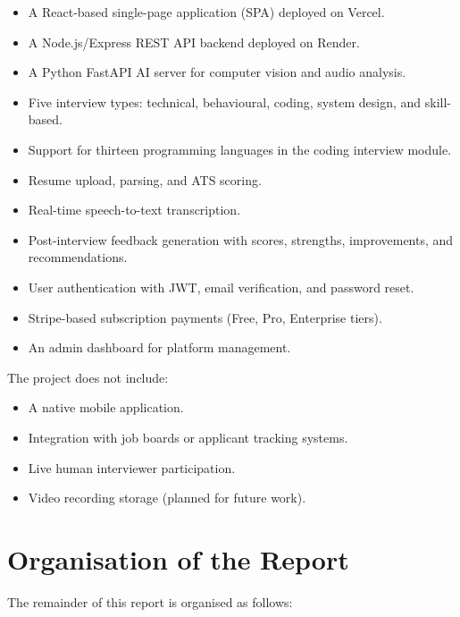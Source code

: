 \begin{itemize}
    \item A React-based single-page application (SPA) deployed on Vercel.
    \item A Node.js/Express REST API backend deployed on Render.
    \item A Python FastAPI AI server for computer vision and audio analysis.
    \item Five interview types: technical, behavioural, coding, system design, and skill-based.
    \item Support for thirteen programming languages in the coding interview module.
    \item Resume upload, parsing, and ATS scoring.
    \item Real-time speech-to-text transcription.
    \item Post-interview feedback generation with scores, strengths, improvements, and recommendations.
    \item User authentication with JWT, email verification, and password reset.
    \item Stripe-based subscription payments (Free, Pro, Enterprise tiers).
    \item An admin dashboard for platform management.
\end{itemize}

The project does not include:
\begin{itemize}
    \item A native mobile application.
    \item Integration with job boards or applicant tracking systems.
    \item Live human interviewer participation.
    \item Video recording storage (planned for future work).
\end{itemize}

\section{Organisation of the Report}

The remainder of this report is organised as follows:

